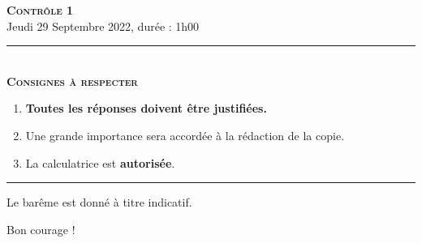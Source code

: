 \documentclass[11pt]{article}
\begin{document}

\begin{center}
\textbf{\LARGE \textsc{Contrôle 1}}\\[2mm]

{\large Jeudi 29 Septembre 2022, durée : 1h00}\\[1mm]
\noindent\rule{8cm}{0.4pt}\\[1mm]
\textbf{\textsc{Consignes à respecter}}
\begin{enumerate}[label=\textbf{\arabic*/}]
\item \textbf{Toutes les réponses doivent être justifiées.}
\item Une grande importance sera accordée à la rédaction de la
  copie.
\item La calculatrice est \textbf{autorisée}.
    \end{enumerate}
\noindent\rule{12cm}{0.4pt}
\end{center}

\vspace{2mm}
\noindent Le barême est donné à titre indicatif.
\vspace{2mm}
\begin{center}
  Bon courage !
\end{center}
\end{document}
